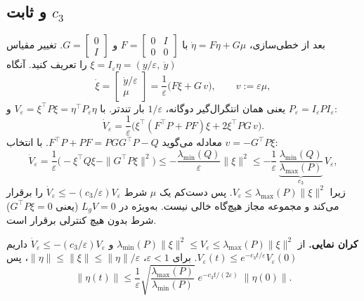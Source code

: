 \documentclass[10pt,twocolumn]{article}
\newcommand{\en}[1]{\lr{#1}}
\begin{document}
\subsection{\en{RES-CLF} و ثابت $c_3$}
بعد از خطی‌سازی، $\dot\eta=F\eta+G\mu$ با
$F=\begin{bmatrix}0&I\\0&0\end{bmatrix}$ و $G=\begin{bmatrix}0\\I\end{bmatrix}$.
تغییر مقیاس $\xi=I_\varepsilon\eta=(y/\varepsilon,\ \dot y)$ را تعریف کنید. آنگاه
\begin{equation*}
    \dot\xi=\begin{bmatrix}\dot y/\varepsilon\\ \mu\end{bmatrix}
    =\frac1\varepsilon\big(F\xi+G\,v\big),\qquad v:=\varepsilon\mu ,
\end{equation*}
یعنی همان انتگرال‌گیر دوگانه، $1/\varepsilon$ بار تندتر. با $V_\varepsilon=\xi^{\top}P\xi=\eta^{\top}P_\varepsilon\eta$
و $P_\varepsilon=I_\varepsilon PI_\varepsilon$:
\begin{equation*}
    \dot V_\varepsilon=\frac1\varepsilon\Big(\xi^{\top}(F^{\top}P+PF)\xi+2\xi^{\top}PG\,v\Big).
\end{equation*}
معادله \en{CARE} می‌گوید $F^{\top}P+PF=PGG^{\top}P-Q$. با انتخاب $v=-G^{\top}P\xi$:
\begin{equation*}
    \dot V_\varepsilon=\frac1\varepsilon\Big(-\xi^{\top}Q\xi-\|G^{\top}P\xi\|^2\Big)
    \le-\frac{\lambda_{\min}(Q)}{\varepsilon}\|\xi\|^2
    \le-\frac{1}{\varepsilon}\,\underbrace{\frac{\lambda_{\min}(Q)}{\lambda_{\max}(P)}}_{c_3}\,V_\varepsilon ,
\end{equation*}
زیرا $V_\varepsilon\le\lambda_{\max}(P)\|\xi\|^2$. پس دست‌کم یک $\mu$ شرط
$\dot V_\varepsilon\le-(c_3/\varepsilon)V_\varepsilon$ را برقرار می‌کند و مجموعه مجاز هیچ‌گاه خالی نیست.
به‌ویژه در $L_gV=0$ (یعنی $G^{\top}P\xi=0$) شرط بدون هیچ کنترلی برقرار است.

\textbf{کران نمایی.} از
$\lambda_{\min}(P)\|\xi\|^2\le V_\varepsilon\le\lambda_{\max}(P)\|\xi\|^2$ و
$\dot V_\varepsilon\le-(c_3/\varepsilon)V_\varepsilon$ داریم $V_\varepsilon(t)\le e^{-c_3t/\varepsilon}V_\varepsilon(0)$.
برای $\varepsilon<1$، $\|\eta\|\le\|\xi\|\le\|\eta\|/\varepsilon$، پس
\begin{equation*}
    \|\eta(t)\|\le\frac1\varepsilon\sqrt{\frac{\lambda_{\max}(P)}{\lambda_{\min}(P)}}\;e^{-c_3t/(2\varepsilon)}\;\|\eta(0)\| .
\end{equation*}
\end{document}
